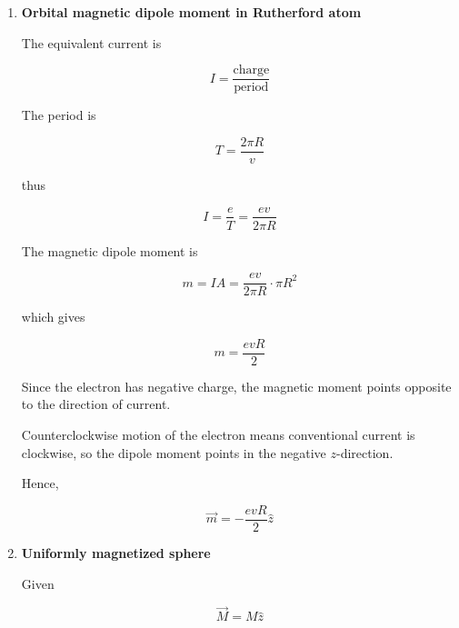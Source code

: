\documentclass[12pt]{article}
\begin{document}
\begin{enumerate}
\begin{itemize}
From the dipole formula on the axis,

\[
\theta=0,\quad r=z
\]

thus

\[
B=
\frac{\mu_0 m}{4\pi z^3}(2)
\]

and using

\[
m=I\pi R^2
\]

we obtain

\[
B=
\frac{\mu_0 I R^2}{2z^3}
\]

which is exactly the same result. Therefore,

\[
\boxed{\text{The dipole approximation is consistent with the exact field}}
\]

\end{itemize}

\vspace{0.5cm}

\item \textbf{Orbital magnetic dipole moment in Rutherford atom}

The equivalent current is

\[
I=\frac{\text{charge}}{\text{period}}
\]

The period is

\[
T=\frac{2\pi R}{v}
\]

thus

\[
I=\frac{e}{T}
=
\frac{ev}{2\pi R}
\]

The magnetic dipole moment is

\[
m=IA
=
\frac{ev}{2\pi R}\cdot \pi R^2
\]

which gives

\[
m=\frac{evR}{2}
\]

Since the electron has negative charge, the magnetic moment points opposite to the direction of current.

Counterclockwise motion of the electron means conventional current is clockwise, so the dipole moment points in the negative \(z\)-direction.

Hence,

\[
\boxed{
\vec m=
-\frac{evR}{2}\hat z
}
\]

\vspace{0.5cm}

\item \textbf{Uniformly magnetized sphere}

Given

\[
\vec M=M\hat z
\]

\begin{itemize}


\end{itemize}
\end{enumerate}
\end{document}
